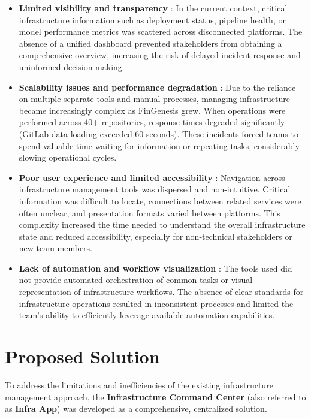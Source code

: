 \begin{itemize}
    \item \textbf{Limited visibility and transparency} : In the current context, critical infrastructure information such as deployment status, pipeline health, or model performance metrics was scattered across disconnected platforms. The absence of a unified dashboard prevented stakeholders from obtaining a comprehensive overview, increasing the risk of delayed incident response and uninformed decision-making.
    
    \item \textbf{Scalability issues and performance degradation} : Due to the reliance on multiple separate tools and manual processes, managing infrastructure became increasingly complex as FinGenesis grew. When operations were performed across 40+ repositories, response times degraded significantly (GitLab data loading exceeded 60 seconds). These incidents forced teams to spend valuable time waiting for information or repeating tasks, considerably slowing operational cycles.
    
    \item \textbf{Poor user experience and limited accessibility} : Navigation across infrastructure management tools was dispersed and non-intuitive. Critical information was difficult to locate, connections between related services were often unclear, and presentation formats varied between platforms. This complexity increased the time needed to understand the overall infrastructure state and reduced accessibility, especially for non-technical stakeholders or new team members.
    
    \item \textbf{Lack of automation and workflow visualization} : The tools used did not provide automated orchestration of common tasks or visual representation of infrastructure workflows. The absence of clear standards for infrastructure operations resulted in inconsistent processes and limited the team's ability to efficiently leverage available automation capabilities.
\end{itemize}

\section{Proposed Solution}

To address the limitations and inefficiencies of the existing infrastructure management approach, the \textbf{Infrastructure Command Center} (also referred to as \textbf{Infra App}) was developed as a comprehensive, centralized solution.

